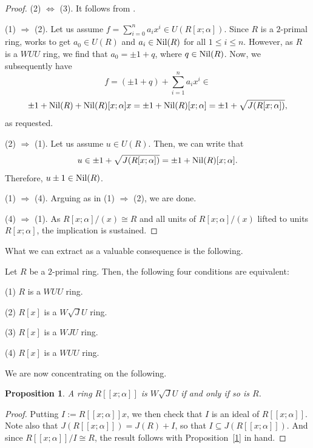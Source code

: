 \documentclass[12pt]{amsart}
\newtheorem{proposition}[theorem]{Proposition} \newtheorem{lemma}[theorem]{Lemma}
\begin{document}
\begin{proof} (2) $\Leftrightarrow$ (3). It follows from \cite[Corollary 3.14]{DDE}. 	

(1) $\Rightarrow$ (2). Let us assume $f=\sum_{i=0}^{n}a_ix^i \in U(R[x; \alpha])$. Since $R$ is a $2$-primal ring, \cite[Corollary 2.14]{Chenpr} works to get $a_0 \in U(R)$ and $a_i \in {\rm Nil}(R)$ for all $1 \le i \le n$. However, as $R$ is a $WUU$ ring, we find that \( a_0 = \pm1 + q \), where \( q \in {\rm Nil}(R) \). Now, we subsequently have $$f = (\pm1 + q) + \sum_{i=1}^{n}a_ix^i \in$$
$$\pm1 + {\rm Nil}(R) + {\rm Nil}(R)[x; \alpha]x=\pm1+{\rm Nil}(R)[x; \alpha]=\pm1+\sqrt{J(R[x; \alpha])},$$
as requested.	

(2) $\Rightarrow$ (1). Let us assume $u \in U(R)$. Then, we can write that $$u \in \pm1 + \sqrt{J(R[x; \alpha])} = \pm1 + {\rm Nil}(R)[x; \alpha].$$ Therefore, $u \pm 1 \in {\rm Nil}(R)$. 	

(1) $\Rightarrow$ (4). Arguing as in (1) $\Rightarrow$ (2), we are done.

(4) $\Rightarrow$ (1). As $R[x; \alpha]/(x)\cong R$ and all units of $R[x; \alpha]/(x)$ lifted to units $R[x; \alpha]$, the implication is sustained.
\end{proof}

What we can extract as a valuable consequence is the following.

\begin{corollary} Let $R$ be a $2$-primal ring. Then, the following four conditions are equivalent:

(1) $R$ is a $WUU$ ring.

(2) $R[x]$ is a $W\sqrt{J}U$ ring.

(3) $R[x]$ is a $WJU$ ring.

(4) $R[x]$ is a $WUU$ ring.
\end{corollary}

We are now concentrating on the following.

\begin{proposition}\label{3.9} A ring $R[[x; \alpha]]$ is $W\sqrt{J}U$ if and only if so is $R$.
\end{proposition}

\begin{proof} Putting $I := R[[x; \alpha]]x$, we then check that $I$ is an ideal of $R[[x; \alpha]]$. Note also
that $J(R[[x; \alpha]])=J(R)+I$, so that $I\subseteq J(R[[x; \alpha]])$. And since $R[[x; \alpha]]/I\cong R$, the result follows with Proposition~\ref{1} in hand.
\end{proof}
\end{document}
